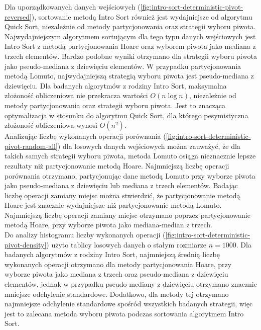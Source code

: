 Dla uporządkowanych danych wejściowych (\ref{fig:intro-sort-deterministic-pivot-reversed}), sortowanie metodą Intro Sort również jest wydajniejsze od algorytmu Quick Sort, niezależnie od metody partycjonowania oraz strategii wyboru piwota. Najwydajniejszym algorytmem sortującym dla tego typu danych wejściowych jest Intro Sort z metodą partycjonowania Hoare oraz wyborem piwota jako mediana z trzech elementów. Bardzo podobne wyniki otrzymano dla strategii wyboru piwota jako pseudo-mediana z dziewięciu elementów. W przypadku partycjonowania metodą Lomuto, najwydajniejszą strategią wyboru piwota jest pseudo-mediana z dziewięciu. Dla badanych algorytmów z rodziny Intro Sort, maksymalna złożoność obliczeniowa nie przekracza wartości $O(n\log{n})$, niezależnie od metody partycjonowania oraz strategii wyboru piwota. Jest to znacząca optymalizacja w stosunku do algorytmu Quick Sort, dla którego pesymistyczna złożoność obliczeniowa wynosi $O(n^2)$.\\

Analizując liczbę wykonanych operacji porównania (\ref{fig:intro-sort-deterministic-pivot-random-all}) dla losowych danych wejściowych można zauważyć, że dla takich samych strategii wyboru piwota, metoda Lomuto osiąga nieznacznie lepsze rezultaty niż partycjonowanie metodą Hoare. Najmniejszą liczbę operacji porównania otrzymano, partycjonując dane metodą Lomuto przy wyborze piwota jako pseudo-mediana z dziewięciu lub mediana z trzech elementów. Badając liczbę operacji zamiany miejsc można stwierdzić, że partycjonowanie metodą Hoare jest znacznie wydajniejsze niż partycjonowanie metodą Lomuto. Najmniejszą liczbę operacji zamiany miejsc otrzymano poprzez partycjonowanie metodą Hoare, przy wyborze piwota jako mediana-median z trzech.\\

Do analizy histogramu liczby wykonanych operacji (\ref{fig:intro-sort-deterministic-pivot-density}) użyto tablicy losowych danych o stałym rozmiarze $n = 1000$. Dla badanych algorytmów z rodziny Intro Sort, najmniejszą średnią liczbę wykonanych operacji otrzymano dla metody partycjonowania Hoare, przy wyborze piwota jako mediana z trzech oraz pseudo-mediana z dziewięciu elementów, jednak w przypadku pseudo-mediany z dziewięciu otrzymano znacznie mniejsze odchylenie standardowe. Dodatkowo, dla metody tej otrzymano najmniejsze odchylenie standardowe spośród wszystkich badanych strategii, więc jest to zalecana metoda wyboru piwota podczas sortowania algorytmem Intro Sort.\\

